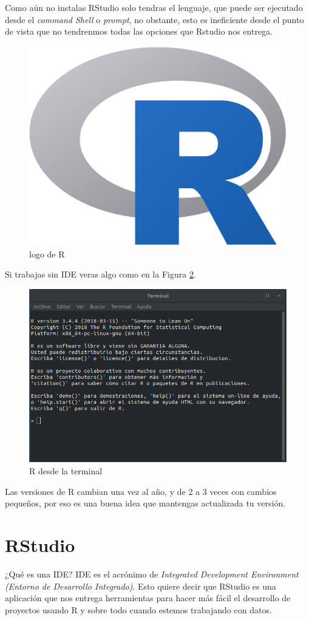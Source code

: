 \documentclass[12pt,]{book}
\begin{document}
Como aún no instalas RStudio solo tendras el lenguaje, que puede ser
ejecutado desde el \emph{command Shell} o \emph{prompt}, no obstante,
esto es ineficiente desde el punto de vista que no tendrenmos todas las
opciones que Rstudio nos entrega.

\begin{figure}

{\centering \includegraphics[width=0.333\linewidth]{images/R_logo} 

}

\caption{logo de R}\label{fig:fig1}
\end{figure}

Si trabajas sin IDE veras algo como en la Figura \ref{fig:fig2}.

\begin{figure}

{\centering \includegraphics[width=0.5\linewidth]{images/r_propmt} 

}

\caption{R desde la terminal}\label{fig:fig2}
\end{figure}

Las versiones de R cambian una vez al año, y de 2 a 3 veces con cambios
pequeños, por eso es una buena idea que mantengas actualizada tu
versión.

\section{RStudio}\label{rstudio}

¿Qué es una IDE? IDE es el acrónimo de \emph{Integrated Development
Environment (Entorno de Desarrollo Integrado)}. Esto quiere decir que
RStudio es una aplicación que nos entrega herramientas para hacer más
fácil el desarrollo de proyectos usando R y sobre todo cuando estemos
trabajando con datos.
\end{document}

